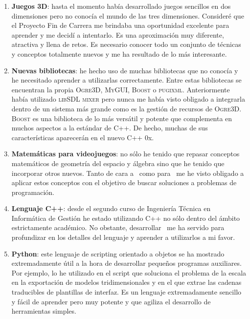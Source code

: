 \begin{enumerate}
    \itemsep0em
    \item \textbf{Juegos 3D}: hasta el momento había desarrollado juegos
    sencillos en dos dimensiones pero no conocía el mundo de las tres dimensiones.
    Consideré que el Proyecto Fin de Carrera me brindaba una oportunidad
    excelente para aprender y me decidí a intentarlo. Es una aproximación
    muy diferente, atractiva y llena de retos. Es necesario conocer todo
    un conjunto de técnicas y conceptos totalmente nuevos y me ha resultado
    de lo más interesante.\\
    
    \item \textbf{Nuevas bibliotecas}: he hecho uso de muchas bibliotecas
    que no conocía y he necesitado aprender a utilizarlas correctamente.
    Entre estas bibliotecas se encuentran la propia \textsc{Ogre3D},
    \textsc{MyGUI}, \textsc{Boost} o \textsc{pugixml}. Anteriormente
    había utilizado \textsc{libSDL mixer} pero nunca me había visto obligado
    a integrarla dentro de un sistema más grande como es la gestión
    de recursos de \textsc{Ogre3D}. \textsc{Boost} es una biblioteca de
    lo más versátil y potente que complementa en muchos aspectos a la
    estándar de C++. De hecho, muchas de sus características aparecerán
    en el nuevo C++ 0x.\\
    
    \item \textbf{Matemáticas para videojuegos}: no sólo he tenido que repasar
    conceptos matemáticos de geometría del espacio y álgebra sino que he
    tenido que incorporar otros nuevos. Tanto de cara a \wiki\ como para
    \juego\ me he visto obligado a aplicar estos conceptos con el objetivo
    de buscar soluciones a problemas de programación.\\
    
    \item \textbf{Lenguaje C++}: desde el segundo curso de Ingeniería
    Técnica en Informática de Gestión he estado utilizando C++ no sólo
    dentro del ámbito estrictamente académico. No obstante, desarrollar
    \juego\ me ha servido para profundizar en los detalles del lenguaje
    y aprender a utilizarlos a mi favor.\\
    
    \item \textbf{Python}: este lenguaje de scripting orientado a objetos
    se ha mostrado extremadamente útil a la hora de desarrollar
    pequeños programas auxiliares. Por ejemplo, lo he utilizado en el script
    que soluciona el problema de la escala en la exportación de modelos
    tridimensionales y en el que extrae las cadenas traducibles de plantillas
    de interfaz. Es un lenguaje extremadamente sencillo y fácil de aprender
    pero muy potente y que agiliza el desarrollo de herramientas simples.\\
     

\end{enumerate}
